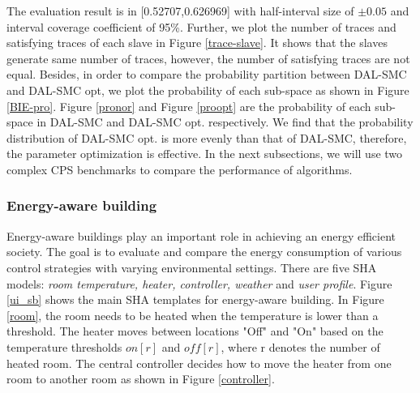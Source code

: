 The evaluation result is in [0.52707,0.626969] with half-interval size of $\pm0.05$ and interval coverage coefficient of 95\%. Further, we plot the number of traces and satisfying traces of each slave in Figure \ref{trace-slave}. It shows that the slaves generate same number of traces, however, the number of satisfying traces are not equal. Besides, in order to compare the probability partition between DAL-SMC and DAL-SMC opt, we plot the probability of each sub-space as shown in Figure \ref{BIE-pro}. Figure \ref{pronor} and Figure \ref{proopt} are the probability of each sub-space in DAL-SMC and DAL-SMC opt. respectively. We find that the probability distribution of DAL-SMC opt. is more evenly than that of DAL-SMC, therefore, the parameter optimization is effective. In the next subsections, we will use two complex CPS benchmarks to compare the performance of algorithms.
\begin{figure}[htbp]
\end{figure}

\subsubsection{Energy-aware building}
Energy-aware buildings play an important role in achieving an energy efficient society. The goal is to evaluate and compare the energy consumption of various control strategies with varying environmental settings. There are five SHA models: \emph{room temperature, heater, controller, weather} and \emph{user profile}. Figure \ref{ui_sb} shows the main SHA templates for energy-aware building. In Figure \ref{room}, the room needs to be heated when the temperature is lower than a threshold. The heater moves between locations "Off" and "On" based on the temperature thresholds $on[r]$ and $off[r]$, where r denotes the number of heated room. The central controller decides how to move the heater from one room to another room as shown in Figure \ref{controller}.

